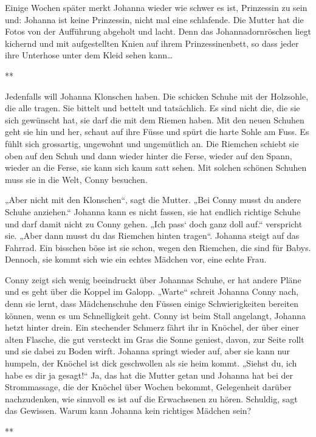 \documentclass[10pt,titlepage,a5paper]{book}
\newcommand{\sterne}{\par{\centering ***\par}}
\begin{document}
Einige Wochen später merkt Johanna wieder wie schwer es ist, Prinzessin zu sein und: Johanna ist keine Prinzessin, nicht mal eine schlafende. Die Mutter hat die Fotos von der Aufführung abgeholt und lacht. Denn das Johannadornröschen liegt kichernd und mit aufgestellten Knien auf ihrem Prinzessinenbett, so dass jeder ihre Unterhose unter dem Kleid sehen kann\dots


\sterne


Jedenfalls will Johanna Klonschen haben. Die schicken Schuhe mit der Holzsohle, die alle tragen. Sie bittelt und bettelt und tatsächlich. Es sind nicht die, die sie sich gewünscht hat, sie darf die mit dem Riemen haben. Mit den neuen Schuhen geht sie hin und her, schaut auf ihre Füsse und spürt die harte Sohle am Fuss. Es fühlt sich grossartig, ungewohnt und ungemütlich an. Die Riemchen schiebt sie oben auf den Schuh und dann wieder hinter die Ferse, wieder auf den Spann, wieder an die Ferse, sie kann sich kaum satt sehen. Mit solchen schönen Schuhen muss sie in die Welt, Conny besuchen.

 „Aber nicht mit den Klonschen“, sagt die Mutter. „Bei Conny musst du andere Schuhe anziehen.“ Johanna kann es nicht fassen, sie hat endlich richtige Schuhe und darf damit nicht zu Conny gehen. „Ich pass` doch ganz doll auf.“ verspricht sie. „Aber dann musst du das Riemchen hinten tragen“. Johanna steigt auf das Fahrrad. Ein bisschen böse ist sie schon, wegen den Riemchen, die sind für Babys.  Dennoch,  sie kommt sich wie ein echtes Mädchen vor, eine echte Frau. 
 
Conny zeigt sich wenig beeindruckt über Johannas Schuhe, er hat andere Pläne und es geht über die Koppel im Galopp. „Warte“ schreit Johanna Conny nach, denn sie lernt, dass  Mädchenschuhe den Füssen einige Schwierigkeiten bereiten können, wenn es um Schnelligkeit geht. Conny ist beim Stall angelangt, Johanna hetzt hinter drein. Ein stechender Schmerz fährt ihr in Knöchel, der über einer alten Flasche, die gut versteckt im Gras die Sonne geniest, davon, zur Seite rollt und sie dabei zu Boden wirft. Johanna springt wieder auf, aber sie kann nur humpeln, der Knöchel ist dick geschwollen als sie heim kommt. „Siehst du, ich habe es dir ja gesagt!“ Ja, das hat die Mutter getan und Johanna hat bei der Strommassage, die der Knöchel über Wochen bekommt, Gelegenheit darüber nachzudenken, wie sinnvoll es ist auf die Erwachsenen zu hören. Schuldig, sagt das Gewissen. Warum kann Johanna kein richtiges Mädchen sein?


\sterne
\end{document}
